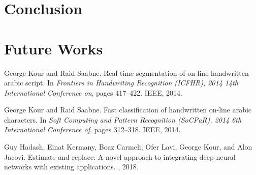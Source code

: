\documentclass{article}
\begin{document}
	\section{Conclusion}
	
	\section{Future Works}
	
	
	  
	
	
	\begin{thebibliography}{1}
		
		George Kour and Raid Saabne.
		\newblock Real-time segmentation of on-line handwritten arabic script.
		\newblock In {\em Frontiers in Handwriting Recognition (ICFHR), 2014 14th
			International Conference on}, pages 417--422. IEEE, 2014.
		
		George Kour and Raid Saabne.
		\newblock Fast classification of handwritten on-line arabic characters.
		\newblock In {\em Soft Computing and Pattern Recognition (SoCPaR), 2014 6th
			International Conference of}, pages 312--318. IEEE, 2014.
		
		Guy Hadash, Einat Kermany, Boaz Carmeli, Ofer Lavi, George Kour, and Alon
		Jacovi.
		\newblock Estimate and replace: A novel approach to integrating deep neural
		networks with existing applications.
		, 2018.
		
	\end{thebibliography}
	
	
\end{document}
